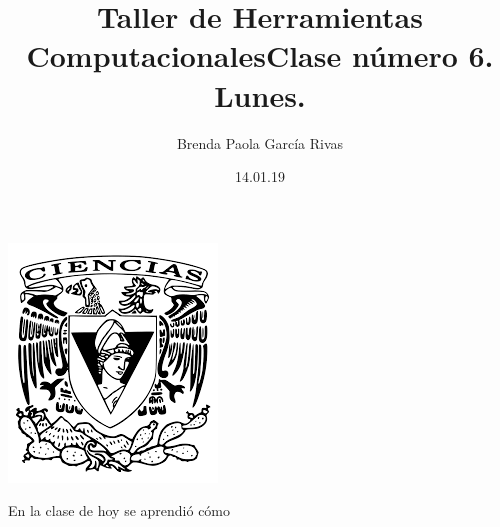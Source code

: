 \documentclass[letterpaper, 12pt, oneside]{article}
\title{\Huge\color{purple} Taller de Herramientas Computacionales}
\author{Brenda Paola García Rivas}
\date{14.01.19}
\begin{document}
	\maketitle
	\begin{center}
		\includegraphics[scale=0.95]{1.png}
	\end{center}
	\newpage
	\title{\Huge Clase número 6. Lunes.}
	
	En la clase de hoy se aprendió cómo 
\end{document}
